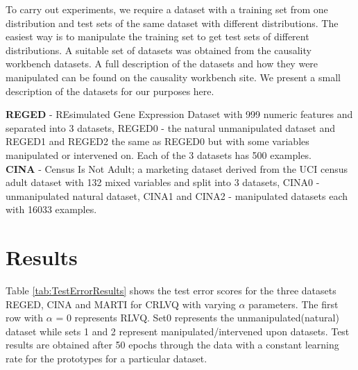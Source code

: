 \documentclass{esannV2}
\begin{document}
To carry out experiments, we require a dataset with a training set from one distribution and test sets of the same dataset with different distributions. The easiest way is to manipulate the training set to get test sets of different distributions. A suitable set of datasets was obtained from the causality workbench datasets\cite{13}. A full description of the datasets and how they were manipulated can be found on the causality workbench site. We present a small description of the datasets for our purposes here.

\noindent
\textbf{REGED} - REsimulated Gene Expression Dataset with 999 numeric features and separated into 3 datasets, REGED0 - the natural unmanipulated dataset and REGED1 and REGED2 the same as REGED0 but with some variables manipulated or intervened on. Each of the 3 datasets has 500 examples.\\
\noindent
\textbf{CINA} - Census Is Not Adult; a marketing dataset derived from the UCI census adult dataset with 132 mixed variables and split into 3 datasets, CINA0 - unmanipulated natural dataset, CINA1 and CINA2 - manipulated datasets each with 16033 examples.\\
\noindent

\section{Results}
\label{sec:Results}

Table \ref{tab:TestErrorResults} shows the test error scores for the three datasets REGED, CINA and MARTI for CRLVQ with varying $\alpha$ parameters. The first row with $\alpha$ = 0 represents RLVQ. Set0 represents the unmanipulated(natural) dataset while sets 1 and 2 represent manipulated/intervened upon datasets. Test results are obtained after 50 epochs through the data with a constant learning rate for the prototypes for a particular dataset.
\end{document}
